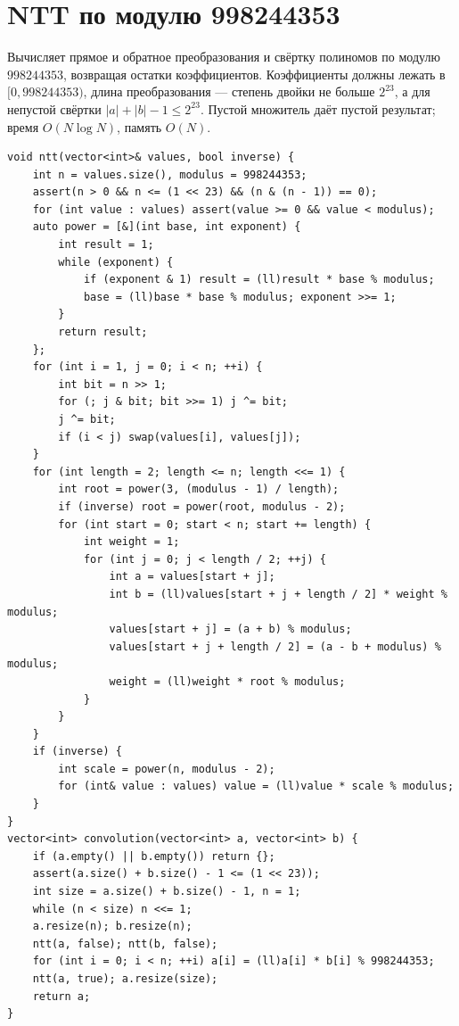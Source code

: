 \section{NTT по модулю 998244353}
Вычисляет прямое и обратное преобразования и свёртку полиномов по модулю $998244353$, возвращая остатки коэффициентов.
Коэффициенты должны лежать в $[0,998244353)$, длина преобразования --- степень двойки не больше $2^{23}$, а для непустой свёртки $|a|+|b|-1\le2^{23}$.
Пустой множитель даёт пустой результат; время $O(N\log N)$, память $O(N)$.
\begin{lstlisting}[name=extra_math_ntt]
void ntt(vector<int>& values, bool inverse) {
    int n = values.size(), modulus = 998244353;
    assert(n > 0 && n <= (1 << 23) && (n & (n - 1)) == 0);
    for (int value : values) assert(value >= 0 && value < modulus);
    auto power = [&](int base, int exponent) {
        int result = 1;
        while (exponent) {
            if (exponent & 1) result = (ll)result * base % modulus;
            base = (ll)base * base % modulus; exponent >>= 1;
        }
        return result;
    };
    for (int i = 1, j = 0; i < n; ++i) {
        int bit = n >> 1;
        for (; j & bit; bit >>= 1) j ^= bit;
        j ^= bit;
        if (i < j) swap(values[i], values[j]);
    }
    for (int length = 2; length <= n; length <<= 1) {
        int root = power(3, (modulus - 1) / length);
        if (inverse) root = power(root, modulus - 2);
        for (int start = 0; start < n; start += length) {
            int weight = 1;
            for (int j = 0; j < length / 2; ++j) {
                int a = values[start + j];
                int b = (ll)values[start + j + length / 2] * weight % modulus;
                values[start + j] = (a + b) % modulus;
                values[start + j + length / 2] = (a - b + modulus) % modulus;
                weight = (ll)weight * root % modulus;
            }
        }
    }
    if (inverse) {
        int scale = power(n, modulus - 2);
        for (int& value : values) value = (ll)value * scale % modulus;
    }
}
vector<int> convolution(vector<int> a, vector<int> b) {
    if (a.empty() || b.empty()) return {};
    assert(a.size() + b.size() - 1 <= (1 << 23));
    int size = a.size() + b.size() - 1, n = 1;
    while (n < size) n <<= 1;
    a.resize(n); b.resize(n);
    ntt(a, false); ntt(b, false);
    for (int i = 0; i < n; ++i) a[i] = (ll)a[i] * b[i] % 998244353;
    ntt(a, true); a.resize(size);
    return a;
}
\end{lstlisting}
%

